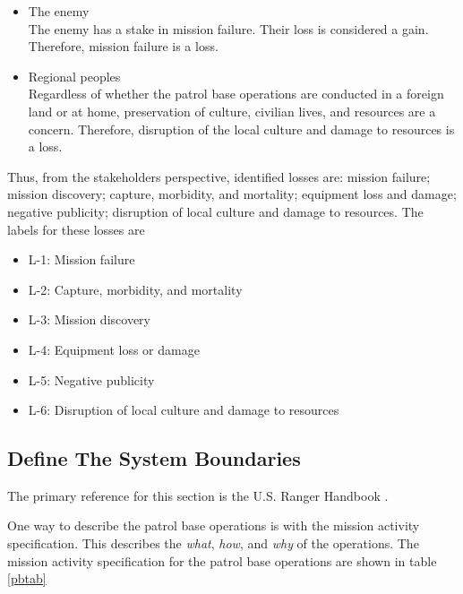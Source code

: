 \documentclass[../../main/main.tex]{subfiles}
\begin{document}
\begin{itemize}
\item The enemy\\
The enemy has a stake in mission failure.  Their loss is considered a gain.  Therefore, mission failure is a loss.  
\item Regional peoples\\
Regardless of whether the patrol base operations are conducted in a foreign land or at home, preservation of culture, civilian lives, and resources are a concern.  Therefore, disruption of the local culture and damage to resources is a loss. 
\end{itemize}

Thus, from the stakeholders perspective, identified losses are: mission failure; mission discovery; capture, morbidity, and mortality; equipment loss and damage; negative publicity; disruption of local culture and damage to resources.  The labels for these losses are 

\begin{itemize}
\item L-1: Mission failure
\item L-2: Capture, morbidity, and mortality
\item L-3: Mission discovery
\item L-4: Equipment loss or damage
\item L-5: Negative publicity
\item L-6: Disruption of local culture and damage to resources
\end{itemize}

\subsection{Define The System Boundaries}
The primary reference for this section is the U.S. Ranger Handbook \cite{rangermanual}.

One way to describe the patrol base operations is with the mission activity specification.  This describes the \textit{what}, \textit{how}, and \textit{why} of the operations. The mission activity specification for the patrol base operations are shown in table \ref{pbtab}
\end{document}
